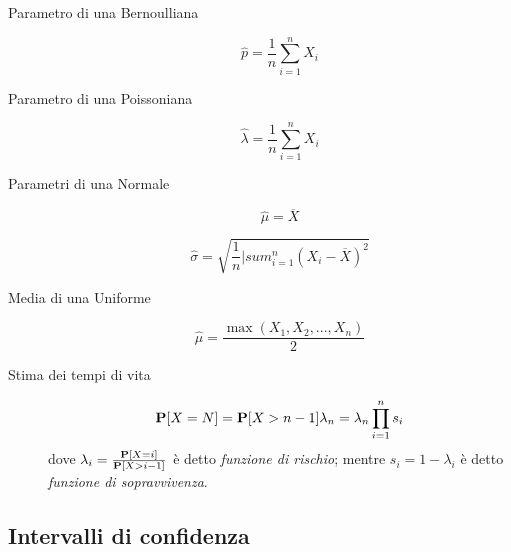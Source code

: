 \begin{description}

	\item[Parametro di una Bernoulliana]
	\begin{equation}
	\hat{p} = \frac{1}{n}\sum_{i=1}^{n} X_{i}
	\end{equation}
	
	\item[Parametro di una Poissoniana]
	\begin{equation}
	\hat{\lambda} = \frac{1}{n}\sum_{i=1}^{n} X_{i}
	\end{equation}
	
	\item[Parametri di una Normale]
	\begin{equation}
	\hat{\mu} = \overline{X}
	\end{equation}

	\begin{equation}
	\hat{\sigma} = \sqrt{\frac{1}{n}|sum_{i=1}^{n} (X_{i}-\overline{X})^{2}}
	\end{equation}
	
	\item[Media di una Uniforme]
	\begin{equation}
	\hat{\mu} = \frac{\max (X_{1},X_{2},...,X_{n})}{2}
	\end{equation}
	
	\item[Stima dei tempi di vita]
	\begin{equation}
	\mathbf{P}[X=N]=\mathbf{P}[X>n-1]\lambda_{n}=\lambda_{n}\prod_{i=1}^{n}s_{i}
	\end{equation}
	dove $\lambda_{i}=\frac{\mathbf{P}[X=i]}{\mathbf{P}[X>i-1]}$ è detto \textit{funzione di rischio}; mentre
	$s_{i}=1-\lambda_{i}$ è detto \textit{funzione di sopravvivenza}.
\end{description}

\subsection{Intervalli di confidenza}

